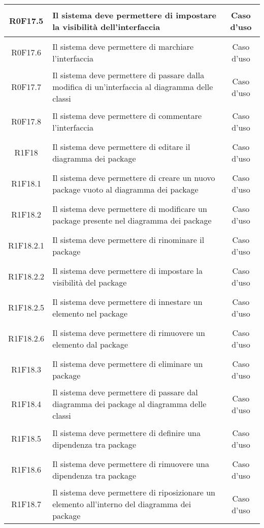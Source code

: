 \documentclass[../AnalisiDeiRequisiti.tex]{subfiles}
\begin{document}
\begin{longtable}{|c|>{\centering}p{7cm}|c|}
	\hypertarget{R0F17.5}{R0F17.5} & Il sistema deve permettere di impostare la visibilità dell'interfaccia & Caso d'uso \\ \hline
	\hypertarget{R0F17.6}{R0F17.6} & Il sistema deve permettere di marchiare l'interfaccia & Caso d'uso \\ \hline
	\hypertarget{R0F17.7}{R0F17.7} & Il sistema deve permettere di passare dalla modifica di un'interfaccia al diagramma delle classi & Caso d'uso \\ \hline
	\hypertarget{R0F17.8}{R0F17.8} & Il sistema deve permettere di commentare l'interfaccia & Caso d'uso \\ \hline
	\hypertarget{R1F18}{R1F18} & Il sistema deve permettere di editare il diagramma dei package & Caso d'uso \\ \hline
	\hypertarget{R1F18.1}{R1F18.1} & Il sistema deve permettere di creare un nuovo package vuoto al diagramma dei package & Caso d'uso \\ \hline
	\hypertarget{R1F18.2}{R1F18.2} & Il sistema deve permettere di modificare un package presente nel diagramma dei package & Caso d'uso \\ \hline
	\hypertarget{R1F18.2.1}{R1F18.2.1} & Il sistema deve permettere di rinominare il package & Caso d'uso \\ \hline
	\hypertarget{R1F18.2.2}{R1F18.2.2} & Il sistema deve permettere di impostare la visibilità del package & Caso d'uso \\ \hline
	\hypertarget{R1F18.2.3}{R1F18.2.5} & Il sistema deve permettere di innestare un elemento nel package & Caso d'uso \\ \hline
	\hypertarget{R1F18.2.4}{R1F18.2.6} & Il sistema deve permettere di rimuovere un elemento dal package & Caso d'uso \\ \hline
	\hypertarget{R1F18.3}{R1F18.3} & Il sistema deve permettere di eliminare un package & Caso d'uso \\ \hline
	\hypertarget{R1F18.4}{R1F18.4} & Il sistema deve permettere di passare dal diagramma dei package al diagramma delle classi & Caso d'uso \\ \hline
	\hypertarget{R1F18.5}{R1F18.5} & Il sistema deve permettere di definire una dipendenza tra package & Caso d'uso \\ \hline
	\hypertarget{R1F18.6}{R1F18.6} & Il sistema deve permettere di rimuovere una dipendenza tra package & Caso d'uso \\ \hline
	\hypertarget{R1F18.7}{R1F18.7} & Il sistema deve permettere di riposizionare un elemento all'interno del diagramma dei package & Caso d'uso \\ \hline

\end{longtable}
\end{document}
